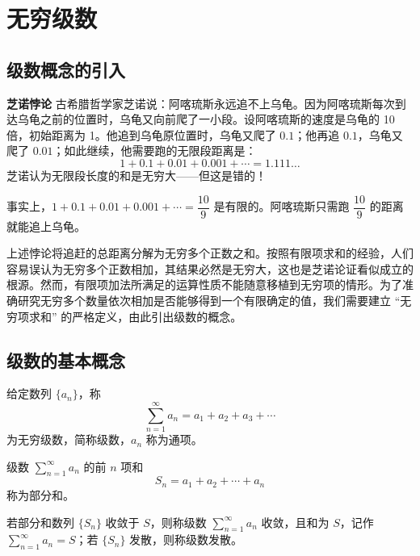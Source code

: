 \documentclass[fontset=fandol]{ctexart}
\newenvironment{custom}[1]{\par\noindent\textbf{#1}\quad}{\par\vspace{0.8em}}
\begin{document}
\clearpage
\section{无穷级数}

\subsection*{级数概念的引入}

\begin{custom}{芝诺悖论}
古希腊哲学家芝诺说：阿喀琉斯永远追不上乌龟。因为阿喀琉斯每次到达乌龟之前的位置时，乌龟又向前爬了一小段。设阿喀琉斯的速度是乌龟的 10 倍，初始距离为 1。他追到乌龟原位置时，乌龟又爬了 \(0.1\)；他再追 \(0.1\)，乌龟又爬了 \(0.01\)；如此继续，他需要跑的无限段距离是：
\[
1 + 0.1 + 0.01 + 0.001 + \cdots = 1.111\ldots
\]
芝诺认为无限段长度的和是无穷大——但这是错的！

事实上，\(1 + 0.1 + 0.01 + 0.001 + \cdots = \dfrac{10}{9}\) 是有限的。阿喀琉斯只需跑 \(\dfrac{10}{9}\) 的距离就能追上乌龟。
\end{custom}

上述悖论将追赶的总距离分解为无穷多个正数之和。按照有限项求和的经验，人们容易误认为无穷多个正数相加，其结果必然是无穷大，这也是芝诺论证看似成立的根源。然而，有限项加法所满足的运算性质不能随意移植到无穷项的情形。为了准确研究无穷多个数量依次相加是否能够得到一个有限确定的值，我们需要建立 “无穷项求和” 的严格定义，由此引出级数的概念。




\subsection{级数的基本概念}




\begin{definition}[常数项级数]
给定数列 \(\{a_n\}\)，称
\[
\sum_{n=1}^{\infty} a_n = a_1 + a_2 + a_3 + \cdots
\]
为无穷级数，简称级数，\(a_n\) 称为通项。
\end{definition}

\begin{definition}[部分和]
级数 \(\sum\limits_{n = 1}^{  \infty }  a_n\) 的前 \(n\) 项和
\[
S_n = a_1 + a_2 + \cdots + a_n
\]
称为部分和。
\end{definition}

\begin{definition}[级数收敛与发散]
若部分和数列 \(\{S_n\}\) 收敛于 \(S\)，则称级数 \(\sum\limits_{n = 1}^{  \infty } a_n\) 收敛，且和为 \(S\)，记作 \(\sum\limits_{n = 1}^{  \infty } a_n = S\)；若 \(\{S_n\}\) 发散，则称级数发散。
\end{definition}
\end{document}
